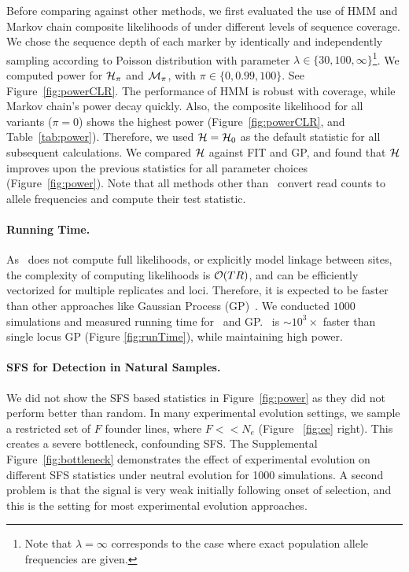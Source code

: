 \documentclass[11pt]{article}
\def\comale{\text{{\sc Comale}}}
\begin{document}
Before comparing against other methods, we first evaluated the use of
HMM and Markov chain composite likelihoods of under different levels
of sequence coverage. We chose the sequence depth of each marker by
identically and independently sampling according to Poisson
distribution with parameter $\lambda\in
\{30,100,\infty\}$\footnote{Note that $\lambda=\infty $ corresponds to
  the case where exact population allele frequencies are given.}. We
computed power for ${\cal H}_\pi$ and ${\cal M}_{\pi}$, with $\pi \in
\{0,0.99,100\}$. See Figure~\ref{fig:powerCLR}. The performance of HMM
is robust with coverage, while Markov chain's power decay
quickly. Also, the composite likelihood for all variants ($\pi=0$)
shows the highest power (Figure~\ref{fig:powerCLR}, and
Table~\ref{tab:power}).  Therefore, we used ${\cal H} = {\cal H}_0$ as
the default statistic for all subsequent calculations. We compared
${\cal H}$ against FIT and GP, and found that ${\cal H}$ improves upon the
previous statistics for all parameter choices (Figure~\ref{fig:power}). Note 
that all methods other
than \comale\ convert read counts to allele frequencies and compute
their test statistic.


\paragraph{Running Time.}
As \comale\ does not compute full likelihoods, or explicitly model
linkage between sites, the complexity of computing likelihoods is
${\cal O}(TR)$, and can be efficiently vectorized for multiple replicates
and loci. Therefore, it is expected to be faster than other approaches
like Gaussian Process (GP)~\cite{Terhorst2015Multi}. We conducted
$1000$ simulations and measured running time for \comale\ and
GP. \comale\ is $\sim 10^3\times$ faster than single locus GP (Figure
\ref{fig:runTime}), while maintaining high power.


\paragraph{SFS for Detection in Natural Samples.} We did not show the
SFS based statistics in Figure~\ref{fig:power} as they did not perform
better than random. In many experimental evolution settings, we sample
a restricted set of $F$ founder lines, where $F<<N_e$ (Figure
~\ref{fig:ee} right). This creates a severe bottleneck, confounding
SFS. The Supplemental Figure~\ref{fig:bottleneck} demonstrates the
effect of experimental evolution on different SFS statistics under
neutral evolution for 1000 simulations. A second problem is that the
signal is very weak initially following onset of selection, and this
is the setting for most experimental evolution approaches.
\end{document}
